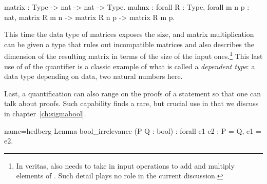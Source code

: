 \begin{coq}{}{}
matrix : Type -> nat -> nat -> Type.
mulmx : forall R : Type, forall m n p : nat,
  matrix R m n -> matrix R n p -> matrix R m p.
\end{coq}

This time the data type of matrices exposes the size, and matrix multiplication
can be given a type that rules out incompatible matrices and also describes
the dimension of the resulting matrix in terms of the size of the input
ones.\footnote{In veritas,  also needs to take in input operations to
add and multiply elements of .  Such detail plays no role in the current
discussion.}
This last use of of the  quantifier is a classic example
of what is called a \emph{dependent type}: a data type depending on
data, two natural numbers here.

Last, a quantification can also range on the proofs of a statement
so that one can talk about proofs.  Such capability finds a rare, but
crucial use in \mcbMC{} that we discuss in chapter~\ref{ch:sigmabool}.

\begin{coq}{name=hedberg}{}
Lemma bool_irrelevance (P Q : bool) : forall e1 e2 : P = Q, e1 = e2.
\end{coq}

%
%
%
%
%
%
%
%
%
